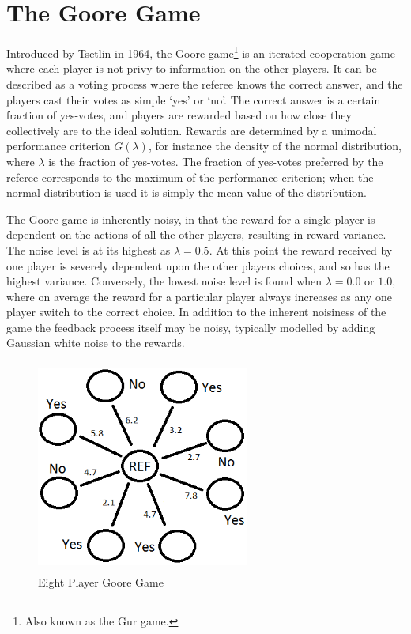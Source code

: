\section{The Goore Game}
Introduced by Tsetlin \cite{Tsetlin1964} in 1964, the Goore game\footnote{Also known as the Gur game.} is an iterated cooperation game where each player is not privy to information on the other players.
It can be described as a voting process where the referee knows the correct answer, and the players cast their votes as simple ‘yes’ or ‘no’.
The correct answer is a certain fraction of yes-votes, and players are rewarded based on how close they collectively are to the ideal solution.
Rewards are determined by a unimodal performance criterion $G(\lambda)$, for instance the density of the normal distribution, where $\lambda$ is the fraction of yes-votes.
The fraction of yes-votes preferred by the referee corresponds to the maximum of the performance criterion; when the normal distribution is used it is simply the mean value of the distribution. 

The Goore game is inherently noisy, in that the reward for a single player is dependent on the actions of all the other players, resulting in reward variance.
The noise level is at its highest as $\lambda = 0.5$.
At this point the reward received by one player is severely dependent upon the other players choices, and so has the highest variance. 
Conversely, the lowest noise level is found when $\lambda = 0.0\text{ or } 1.0$, where on average the reward for a particular player always increases as any one player switch to the correct choice. 
In addition to the inherent noisiness of the game the feedback process itself may be noisy, typically modelled by adding Gaussian white noise to the rewards.

\begin{figure}[htbp]
\centering
\includegraphics[height=70mm,width=70mm]{images/goore_game}
\caption{Eight Player Goore Game}
\label{fig:gg}
\end{figure}

